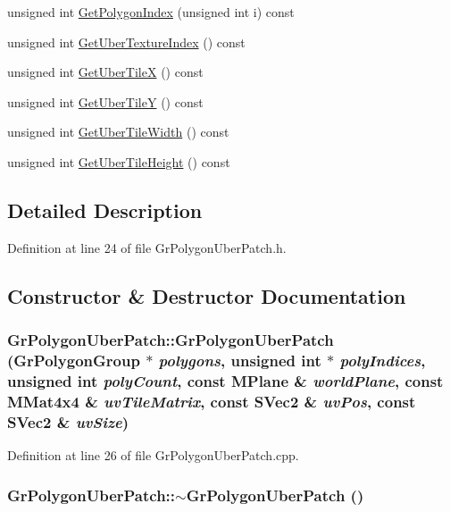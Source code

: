 \begin{CompactItemize}
\item 
unsigned int \hyperlink{class_gr_polygon_uber_patch_51940d367acf3e294341efc596f518cf}{GetPolygonIndex} (unsigned int i) const 
\item 
unsigned int \hyperlink{class_gr_polygon_uber_patch_37b7399470d8347fc40aba50ad8ff37b}{GetUberTextureIndex} () const 
\item 
unsigned int \hyperlink{class_gr_polygon_uber_patch_8eedf03ce219677c3e5a4d720ca856a6}{GetUberTileX} () const 
\item 
unsigned int \hyperlink{class_gr_polygon_uber_patch_7ec4418397af8fc4e5cb3300dd06a1d0}{GetUberTileY} () const 
\item 
unsigned int \hyperlink{class_gr_polygon_uber_patch_0bde2e89a95ba150051072210821db4b}{GetUberTileWidth} () const 
\item 
unsigned int \hyperlink{class_gr_polygon_uber_patch_7c11c389237f476236501ac915a11ff4}{GetUberTileHeight} () const 
\end{CompactItemize}


\subsection{Detailed Description}


Definition at line 24 of file GrPolygonUberPatch.h.

\subsection{Constructor \& Destructor Documentation}
\hypertarget{class_gr_polygon_uber_patch_e8720aea58f72f311e4350973a2e7cab}{
\subsubsection[{GrPolygonUberPatch}]{\setlength{\rightskip}{0pt plus 5cm}GrPolygonUberPatch::GrPolygonUberPatch ({\bf GrPolygonGroup} $\ast$ {\em polygons}, \/  unsigned int $\ast$ {\em polyIndices}, \/  unsigned int {\em polyCount}, \/  const {\bf MPlane} \& {\em worldPlane}, \/  const {\bf MMat4x4} \& {\em uvTileMatrix}, \/  const {\bf SVec2} \& {\em uvPos}, \/  const {\bf SVec2} \& {\em uvSize})}}
\label{class_gr_polygon_uber_patch_e8720aea58f72f311e4350973a2e7cab}




Definition at line 26 of file GrPolygonUberPatch.cpp.\hypertarget{class_gr_polygon_uber_patch_da0fadb60007621660d501dabaf55a26}{
\subsubsection[{$\sim$GrPolygonUberPatch}]{\setlength{\rightskip}{0pt plus 5cm}GrPolygonUberPatch::$\sim$GrPolygonUberPatch ()}}
\label{class_gr_polygon_uber_patch_da0fadb60007621660d501dabaf55a26}




